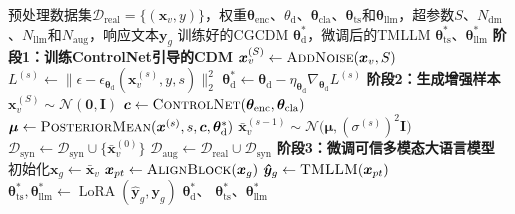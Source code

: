 \documentclass[UTF8,lettersize,journal]{IEEEtran}
\begin{document}
\begin{algorithm}[t]
	\caption{扩散增强可信多模态大语言模型的训练流程}
	\label{alg:training}
	\centering
	\begin{algorithmic}[1]
		\Require 预处理数据集$\mathcal{D}_\text{real}=\{(\mathbf{x}_{v},y)\}$，权重$\bm{\theta}_\mathrm{enc}$、${\theta}_\mathrm{d}$、$\bm{\theta}_\mathrm{cla}$、$\bm{\theta}_\mathrm{ts}$和$\bm{\theta}_\mathrm{llm}$，超参数$S$、$N_\mathrm{dm}$、$N_\mathrm{llm}$和$N_{\text{aug}}$，响应文本$\bm{y}_{g}$
		\Ensure 训练好的CGCDM $\bm{\theta}_\mathrm{d}^*$，微调后的TMLLM $\bm{\theta}_\mathrm{ts}^*$、$\bm{\theta}_\mathrm{llm}^*$
		\Statex \textbf{阶段1：训练ControlNet引导的CDM}
		 
		\State $\bm{x}_{v}^{(S)}\leftarrow\textsc{AddNoise}(\bm{x}_{v},S)$
		\State $L^{(s)}\!\leftarrow\!\lVert\epsilon-\epsilon_{\bm{\theta}_\mathrm{d}}(\bm{x}_{v}^{(s)},y,s)\rVert_2^2$
		\State $\bm{\theta}_\mathrm{d}^*\!\leftarrow\!\bm{\theta}_\mathrm{d}-\eta_{\bm{\theta}_\mathrm{d}}\nabla_{\bm{\theta}_\mathrm{d}}L^{(s)}$
		\EndFor
		\EndFor
		\Statex \textbf{阶段2：生成增强样本}
		 
		\State $\bm x_{v}^{(S)}\sim\mathcal N(\bm 0,\bm I)$ 
		\State $\bm c\leftarrow\textsc{ControlNet}(\bm{\theta}_\mathrm{enc}, \bm{\theta}_\mathrm{cla})$
		\State $\bm\mu\leftarrow\textsc{PosteriorMean}(\bm x^{(s)},s,\bm c,\bm{\theta}_\mathrm{d}^*)$
		\State $\bm\bar{\bm x}_{v}^{(s-1)}\sim\mathcal N\!\bigl(\bm\mu,(\sigma^{(s)})^{2}\bm I\bigr)$
		\EndFor
		\State $\mathcal D_{\text{syn}}\gets\mathcal D_{\text{syn}}\cup\{\bar{\bm{x}}_v^{(0)}\}$
		\EndFor
		\State $\mathcal{D}_\text{aug}\!\leftarrow\!\mathcal{D}_\text{real}\cup\mathcal{D}_\text{syn}$
		\Statex \textbf{阶段3：微调可信多模态大语言模型}
		\State 初始化${\bm{x}}_g\!\leftarrow\!\bar{\bm{x}}_v$
		 
		\State $\bm{x}_{pt}\leftarrow\textsc{AlignBlock}(\bm{x}_{g})$
		\State $\bm{\hat y}_{g}\leftarrow\textsc{TMLLM}(\bm{x}_{pt})$
		\State $\bm{\theta}_\mathrm{ts}^*, \bm{\theta}_\mathrm{llm}^*\leftarrow \operatorname{LoRA}(\bm{\hat y}_{g}, \bm{y}_{g})$
		\EndFor
		\EndFor
		\State \Return $\bm{\theta}_\mathrm{d}^*$、 $\bm{\theta}_\mathrm{ts}^*$、$\bm{\theta}_\mathrm{llm}^*$
	\end{algorithmic}
\end{algorithm}
\end{document}
